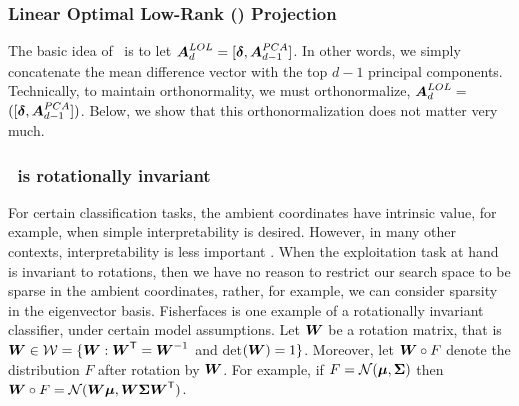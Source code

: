 \documentclass[10pt]{article}
\begin{document}
\subsubsection{Linear Optimal Low-Rank (\Lol) Projection}


The basic idea of \Lol~is to let $\boldsymbol{A}^{LOL}_d=[\boldsymbol{\delta}, \boldsymbol{A}^{PCA}_{d-1}]$.  In other words, we simply concatenate the mean difference vector with the top $d-1$ principal components.  
Technically, to maintain orthonormality, we must orthonormalize, $\boldsymbol{A}^{LOL}_d=$ $([\boldsymbol{\delta}, \boldsymbol{A}^{PCA}_{d-1}])$.  Below, we show that this orthonormalization does not matter very much.







\subsubsection{\Fld~is rotationally invariant}

For certain classification tasks, the ambient coordinates have intrinsic value, for example, when simple interpretability is desired.  However, in many other contexts, interpretability is less important \cite{Breiman01b}.  When the exploitation task at hand is invariant to rotations, then we have no reason to restrict our search space to be sparse in the ambient coordinates, rather, for example, we can consider sparsity in the eigenvector basis.  Fisherfaces is one example of a rotationally invariant classifier, under certain model assumptions. 
Let  $\boldsymbol{W}$ be a rotation matrix, that is $\boldsymbol{W} \in \mathcal{W}=\{\boldsymbol{W} : \boldsymbol{W}^{\mathsf{T}} = \boldsymbol{W}^{-1}$ and det$(\boldsymbol{W})=1\}$. 
Moreover, let $\boldsymbol{W} \circ F$ denote the distribution $F$ after rotation by $\boldsymbol{W}$.  For example, if $F=\mathcal{N}(\boldsymbol{\mu},\boldsymbol{\Sigma})$ then $\boldsymbol{W} \circ F=\mathcal{N}(\boldsymbol{W}  \boldsymbol{\mu}, \boldsymbol{W} \boldsymbol{\Sigma} \boldsymbol{W}^{\mathsf{T}})$.
\end{document}
